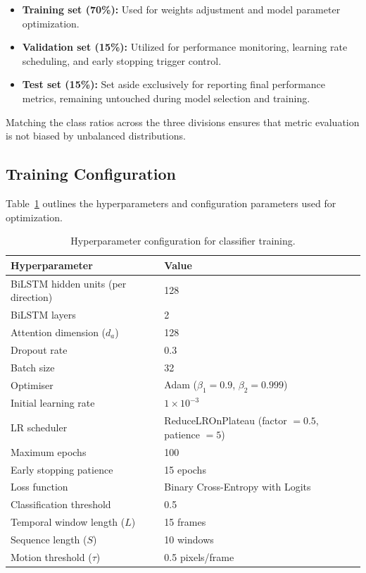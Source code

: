 \begin{itemize}
  \item \textbf{Training set (70\%):} Used for weights adjustment and model parameter optimization.
  \item \textbf{Validation set (15\%):} Utilized for performance monitoring, learning rate scheduling, and early stopping trigger control.
  \item \textbf{Test set (15\%):} Set aside exclusively for reporting final performance metrics, remaining untouched during model selection and training.
\end{itemize}

Matching the class ratios across the three divisions ensures that metric evaluation is not biased by unbalanced distributions.

\subsection{Training Configuration}

Table~\ref{tab:hyperparams} outlines the hyperparameters and configuration parameters used for optimization.

\begin{table}[H]
\centering
\caption{Hyperparameter configuration for classifier training.}
\label{tab:hyperparams}
\footnotesize
\setlength{\tabcolsep}{4pt}
\begin{tabular}{p{4.2cm}p{3.2cm}}
\toprule
\textbf{Hyperparameter} & \textbf{Value} \\
\midrule
BiLSTM hidden units (per direction) & 128 \\
BiLSTM layers & 2 \\
Attention dimension ($d_a$) & 128 \\
Dropout rate & 0.3 \\
Batch size & 32 \\
Optimiser & Adam ($\beta_1 = 0.9$, $\beta_2 = 0.999$) \\
Initial learning rate & $1 \times 10^{-3}$ \\
LR scheduler & ReduceLROnPlateau (factor $= 0.5$, patience $= 5$) \\
Maximum epochs & 100 \\
Early stopping patience & 15 epochs \\
Loss function & Binary Cross-Entropy with Logits \\
Classification threshold & 0.5 \\
Temporal window length ($L$) & 15 frames \\
Sequence length ($S$) & 10 windows \\
Motion threshold ($\tau$) & 0.5 pixels/frame \\
\bottomrule
\end{tabular}
\end{table}

